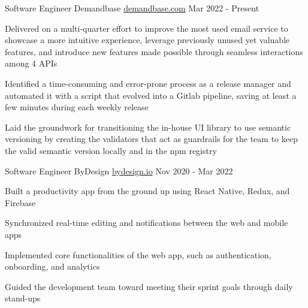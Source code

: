 

\begin{cventries}

\cventry
{Software Engineer} %
{Demandbase} %
{\href{https://www.demandbase.com/}{demandbase.com}} %
{Mar 2022 - Present} %
{
  \begin{cvitems} %
    \item {Delivered on a multi-quarter effort to improve the most used email service to showcase a more intuitive experience, leverage previously unused yet valuable features, and introduce new features made possible through seamless interactions among 4 APIs}
    \item {Identified a time-consuming and error-prone process as a release manager and automated it with a script that evolved into a Gitlab pipeline, saving at least a few minutes during each weekly release}
    \item {Laid the groundwork for transitioning the in-house UI library to use semantic versioning by creating the validators that act as guardrails for the team to keep the valid semantic version locally and in the npm registry}
  \end{cvitems}
}

\cventry
{Software Engineer} %
{ByDesign} %
{\href{https://bydesign.io}{bydesign.io}} %
{Nov 2020 - Mar 2022} %
{
  \begin{cvitems} %
    \item {Built a productivity app from the ground up using React Native, Redux, and Firebase}
    \item {Synchronized real-time editing and notifications between the web and mobile apps}
    \item {Implemented core functionalities of the web app, such as authentication, onboarding, and analytics}
    \item {Guided the development team toward meeting their sprint goals through daily stand-ups}
  \end{cvitems}
}


\end{cventries}
